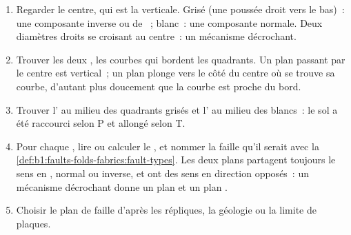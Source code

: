 \begin{method}\label{met:b1:earthquake-source:beachball}
\begin{enumerate}
  \item Regarder le centre, qui est la verticale. Grisé (une poussée droit
        vers le bas)~: une composante inverse ou de ~; blanc~: une composante normale. Deux
        diamètres droits se croisant au centre~: un mécanisme décrochant.
  \item Trouver les deux , les courbes qui bordent les quadrants. Un
        plan passant par le centre est vertical~; un plan plonge vers le côté du
        centre où se trouve sa courbe, d'autant plus doucement que la courbe
        est proche du bord.
  \item Trouver l' au milieu des quadrants grisés et l' au milieu
        des blancs~: le sol a été raccourci selon P et
        allongé selon T.
  \item Pour chaque , lire ou calculer le , et nommer la faille qu'il
        serait avec la \cref{def:b1:faults-folds-fabrics:fault-types}. Les deux
        plans partagent toujours le sens en , normal ou inverse, et ont
        des sens en direction opposés~: un mécanisme décrochant donne un plan 
        et un plan .
  \item Choisir le plan de faille d'après les répliques, la géologie ou la limite
        de plaques.
\end{enumerate}
\end{method}

